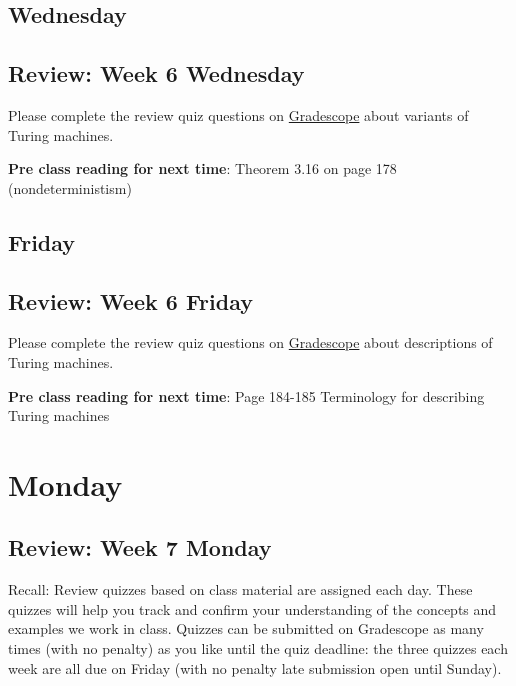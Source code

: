 \newpage
\subsection*{Wednesday}



\newpage
\subsection*{Review: Week 6 Wednesday}

Please complete the review quiz questions on \href{http://gradescope.com}{Gradescope} about 
variants of Turing machines.

{\bf Pre class reading for next time}: Theorem 3.16 on page 178 (nondeterministism)



\newpage
\subsection*{Friday}



\newpage
\subsection*{Review: Week 6 Friday}


Please complete the review quiz questions on \href{http://gradescope.com}{Gradescope} about 
descriptions of Turing machines.

{\bf Pre class reading for next time}: Page 184-185 Terminology for describing Turing machines


\newpage

\section*{Monday}


    
\newpage
\subsection*{Review: Week 7 Monday}


Recall: Review quizzes based on class material are assigned each day. 
These quizzes will help you track and confirm your understanding of the concepts and examples 
we work in class. Quizzes can be submitted on Gradescope as many times (with no penalty) as 
you like until the quiz deadline: the three quizzes each week are all due on Friday (with no penalty 
late submission open until Sunday).

